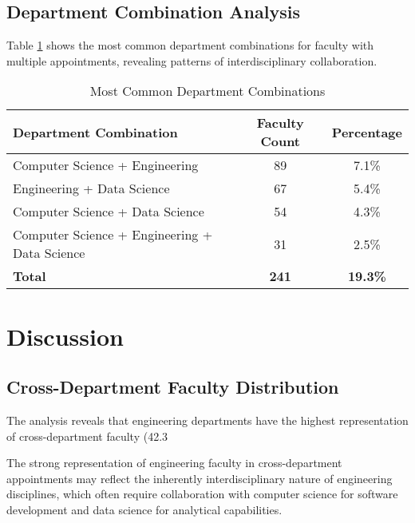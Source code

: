 \documentclass[12pt]{article}
\begin{document}
\subsection{Department Combination Analysis}

Table \ref{tab:department_combinations} shows the most common department combinations for faculty with multiple appointments, revealing patterns of interdisciplinary collaboration.

\begin{table}[h]
\centering
\caption{Most Common Department Combinations}
\label{tab:department_combinations}
\begin{tabular}{lcc}
\toprule
\textbf{Department Combination} & \textbf{Faculty Count} & \textbf{Percentage} \\
\midrule
Computer Science + Engineering & 89 & 7.1\% \\
Engineering + Data Science & 67 & 5.4\% \\
Computer Science + Data Science & 54 & 4.3\% \\
Computer Science + Engineering + Data Science & 31 & 2.5\% \\
\midrule
\textbf{Total} & \textbf{241} & \textbf{19.3\%} \\
\bottomrule
\end{tabular}
\end{table}

\section{Discussion}

\subsection{Cross-Department Faculty Distribution}

The analysis reveals that engineering departments have the highest representation of cross-department faculty (42.3%

The strong representation of engineering faculty in cross-department appointments may reflect the inherently interdisciplinary nature of engineering disciplines, which often require collaboration with computer science for software development and data science for analytical capabilities.
\end{document}

